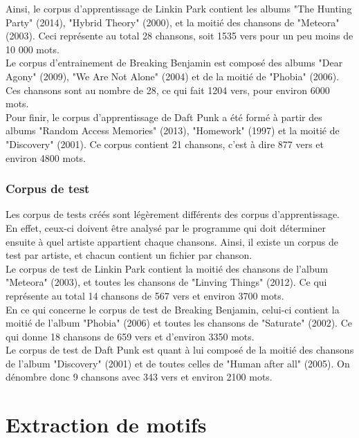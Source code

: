 \documentclass[a4paper]{article}
\begin{document}
	Ainsi, le corpus d'apprentissage de Linkin Park contient les albums "The Hunting Party" (2014), "Hybrid Theory" (2000), et la moitié des chansons de "Meteora" (2003). Ceci représente au total 28 chansons, soit 1535 vers pour un peu moins de 10 000 mots.\\
	
	Le corpus d'entrainement de Breaking Benjamin est composé des albums "Dear Agony" (2009), "We Are Not Alone" (2004) et de la moitié de "Phobia" (2006). Ces chansons sont au nombre de 28, ce qui fait 1204 vers, pour environ 6000 mots.\\
	
	Pour finir, le corpus d'apprentissage de Daft Punk a été formé à partir des albums "Random Access Memories" (2013), "Homework" (1997) et la moitié de "Discovery" (2001). Ce corpus contient 21 chansons, c'est à dire 877 vers et environ 4800 mots.
	
	\subsubsection{Corpus de test}
	
	Les corpus de tests créés sont légèrement différents des corpus d'apprentissage. En effet, ceux-ci doivent être analysé par le programme qui doit déterminer ensuite à quel artiste appartient chaque chansons. Ainsi, il existe un corpus de test par artiste, et chacun contient un fichier par chanson. \\
	
	Le corpus de test de Linkin Park contient la moitié des chansons de l'album "Meteora" (2003), et toutes les chansons de "Linving Things" (2012). Ce qui représente au total 14 chansons de 567 vers et environ 3700 mots.\\
	
	En ce qui concerne le corpus de test de Breaking Benjamin, celui-ci contient la moitié de l'album "Phobia" (2006) et toutes les chansons de "Saturate" (2002). Ce qui donne 18 chansons de 659 vers et d'environ 3350 mots.\\
	
	Le corpus de test de Daft Punk est quant à lui composé de la moitié des chansons de l'album "Discovery" (2001) et de toutes celles de "Human after all" (2005). On dénombre donc 9 chansons avec 343 vers et environ 2100 mots.
	
	
	\section{Extraction de motifs}
	
\end{document}
